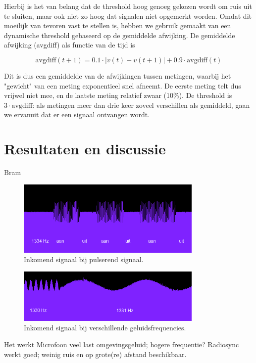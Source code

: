 \documentclass[a4paper,10pt]{article}
\begin{document}
Hierbij is het van belang dat de threshold hoog genoeg gekozen wordt om ruis uit te sluiten, maar ook niet zo hoog dat signalen niet opgemerkt worden. Omdat dit moeilijk van tevoren vast te stellen is, hebben we gebruik gemaakt van een dynamische threshold gebaseerd op de gemiddelde afwijking. De gemiddelde afwijking (avgdiff) als functie van de tijd is

$$\text{avgdiff}(t+1) = 0.1\cdot |v(t) - v(t+1)| + 0.9\cdot\text{avgdiff}(t)$$

Dit is dus een gemiddelde van de afwijkingen tussen metingen, waarbij het "gewicht" van een meting exponentieel snel afneemt. De eerste meting telt dus vrijwel niet mee, en de laatste meting relatief zwaar (10\%). De threshold is $3\cdot\text{avgdiff}$: als metingen meer dan drie keer zoveel verschillen als gemiddeld, gaan we ervanuit dat er een signaal ontvangen wordt.

\section{Resultaten en discussie}\label{sec:resultaten}
Bram
\begin{figure}[ht!]
    \centering
    \includegraphics[width=0.8\textwidth]{resonance_on_off_commit_ff82f.png}
    \caption{Inkomend signaal bij pulserend signaal.}
    \label{fig:on_off}
\end{figure}

\begin{figure}[ht!]
    \centering
    \includegraphics[width=0.8\textwidth]{resonance_2_frequencies_commit_ff82f.png}
    \caption{Inkomend signaal bij verschillende geluidsfrequencies.}
    \label{fig:resonance}
\end{figure}
Het werkt
Microfoon veel last omgevingsgeluid; hogere frequentie?
Radiosync werkt goed; weinig ruis en op grote(re) afstand beschikbaar.
\end{document}
